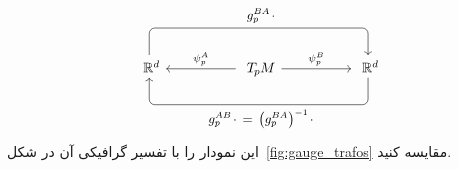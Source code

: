 \vspace*{-1ex}
\begin{equation}\label{eq:commutative_diagram_TpM}
	\begin{tikzcd}[column sep=50pt, row sep=5pt, font=\normalsize]
		\R^d
		\arrow[rr, rounded corners, to path={
			-- ([yshift=4.5ex]\tikztostart.north)
			--node[above, pos=.5]{\small$g_p^{BA} \mkern2mu\cdot$} ([yshift=4.5ex]\tikztotarget.north)
			-- (\tikztotarget.north)
		}]
		& \TpM
		\arrow[l, "\psi_p^A"']
		\arrow[r, "\psi_p^B"]
		& \R^d
		\arrow[ll, rounded corners, to path={
			-- ([yshift=-4.5ex]\tikztostart.south)
			--node[below, pos=.5]{\small$g_p^{AB} \mkern2mu\cdot \,=\, \big( g_p^{BA} \big)^{-1} \mkern2mu\cdot$} ([yshift=-4.5ex]\tikztotarget.south)
			-- (\tikztotarget.south)
		}]
	\end{tikzcd}
	\vspace*{-1ex}%
\end{equation}
این نمودار را با تفسیر گرافیکی آن در شکل~\ref{fig:gauge_trafos} مقایسه کنید.


